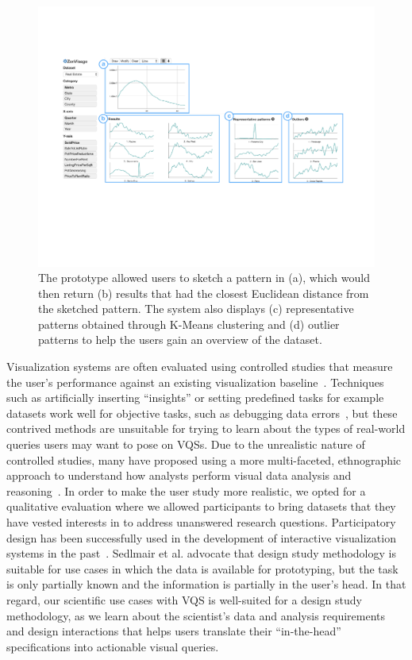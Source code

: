 	\begin{figure}[ht!] 
	\centering
	\includegraphics[width=\linewidth]{figures/oldZV_nozql.pdf}
	\caption{The \zv prototype allowed users to sketch a pattern in (a), which would then return (b) results that had the closest Euclidean distance from the sketched pattern. The system also displays (c) representative patterns obtained through K-Means clustering and (d) outlier patterns to help the users gain an overview of the dataset.}
	\label{oldZV}
	\end{figure}
\par Visualization systems are often evaluated using controlled studies that measure the user's performance against an existing visualization baseline~\cite{Plaisant2004}. Techniques such as artificially inserting ``insights'' or setting predefined tasks for example datasets work well for objective tasks, such as debugging data errors~\cite{kandel2011wrangler,Patel2010}, but these contrived methods are unsuitable for trying to learn about the types of real-world queries users may want to pose on VQSs. Due to the unrealistic nature of controlled studies, many have proposed using a more multi-faceted, ethnographic approach to understand how analysts perform visual data analysis and reasoning~\cite{Plaisant2004,lam2012empirical,shneiderman2006strategies,munzner2009nested,Sedlmair2012}. In order to make the user study more realistic, we opted for a qualitative evaluation where we allowed participants to bring datasets that they have vested interests in to address unanswered research questions. Participatory design has been successfully used in the development of interactive visualization systems in the past~\cite{Aragon2008,Chuang2012}. Sedlmair et al. \cite{Sedlmair2012} advocate that design study methodology is suitable for use cases in which the data is available for prototyping, but the task is only partially known and the information is partially in the user's head. In that regard, our scientific use cases with VQS is well-suited for a design study methodology, as we learn about the scientist's data and analysis requirements and design interactions that helps users translate their ``in-the-head'' specifications into actionable visual queries.
